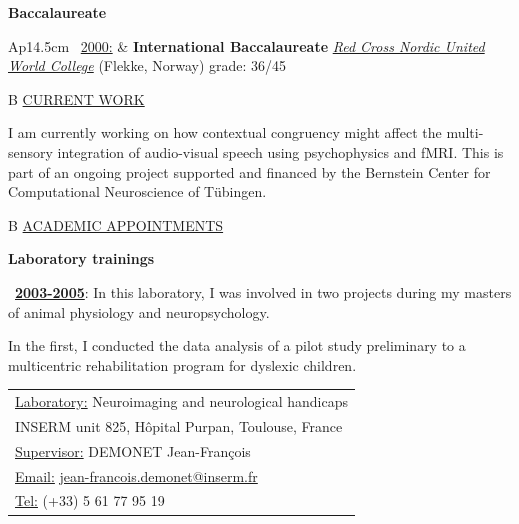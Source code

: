 \documentclass[a4paper,12pt,oneside]{letter}
\begin{document}
{\begin{center}
\Large\textbf{Baccalaureate}
\end{center}

\begin{tabular}{Ap{14.5cm}}
\textbullet~\underline{2000:} & \large\textbf{International Baccalaureate} \newline
				\normalsize \href{http://www.rcnuwc.no/}{\textit{Red Cross Nordic United World College}} (Flekke, Norway) \newline
grade: 36/45 \\
\end{tabular}


\begin{tabular}{B}
\underline{CURRENT WORK}
\end{tabular}

I am currently working on how contextual congruency might affect the multi-sensory integration of audio-visual speech using psychophysics and fMRI. This is part of an ongoing project supported and financed by the Bernstein Center for Computational Neuroscience of Tübingen.


\begin{tabular}{B}
\underline{ACADEMIC APPOINTMENTS}
\end{tabular}

\begin{center}
\Large\textbf{Laboratory trainings}
\end{center}
\begin{minipage}[c]{7.7cm}
\textbullet~\underline{\textbf{2003-2005}}: In this laboratory, I was involved in two projects during my masters of animal physiology and neuropsychology.

\medskip

In the first, I conducted the data analysis of a pilot study preliminary to a multicentric rehabilitation program for dyslexic children.
\end{minipage}
\hfill
\begin{minipage}[c]{10cm}
\setlength\minrowclearance{0.2cm}
\setlength\arrayrulewidth{1.5pt}
\small
\begin{tabular}[t]{|l|}\hline
\underline{Laboratory:} Neuroimaging and neurological handicaps\\
INSERM unit 825, Hôpital Purpan, Toulouse, France\\
\underline{Supervisor:} DEMONET Jean-François\\
\underline{Email:} \href{mailto:jean-francois.demonet@inserm.fr}{jean-francois.demonet@inserm.fr}\\
\underline{Tel:} (+33) 5 61 77 95 19 \\ \hline
\end{tabular}
\end{minipage}

}
\end{document}
